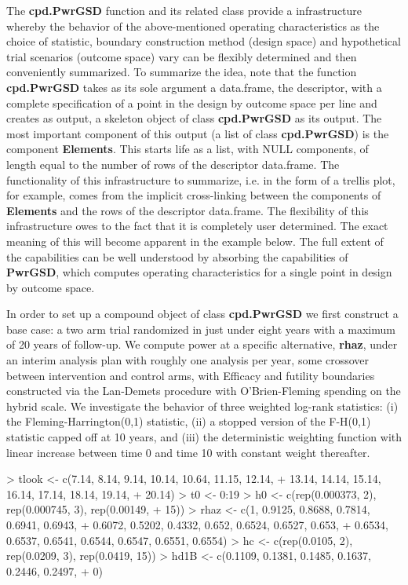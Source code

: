 \documentclass{article}
\begin{document}
The {\bf cpd.PwrGSD} function and its related class provide a infrastructure whereby the
behavior of the above-mentioned operating characteristics as the choice of statistic,
boundary construction method (design space) and hypothetical trial scenarios (outcome
space) vary can be flexibly determined and then conveniently summarized.  To summarize the
idea, note that the function {\bf cpd.PwrGSD} takes as its sole argument a data.frame, the
descriptor, with a complete specification of a point in the design by outcome space per
line and creates as output, a skeleton object of class {\bf cpd.PwrGSD} as its output.
The most important component of this output (a list of class {\bf cpd.PwrGSD}) is the
component {\bf Elements}. This starts life as a list, with NULL components, of length
equal to the number of rows of the descriptor data.frame. The functionality of this
infrastructure to summarize, i.e. in the form of a trellis plot, for example, comes from
the implicit cross-linking between the components of {\bf Elements} and the rows of the
descriptor data.frame.  The flexibility of this infrastructure owes to the fact that it is
completely user determined.  The exact meaning of this will become apparent in the example
below. The full extent of the capabilities can be well understood by absorbing the
capabilities of {\bf PwrGSD}, which computes operating characteristics for a single point
in design by outcome space.

In order to set up a compound object of class {\bf cpd.PwrGSD} we first construct a base
case: a two arm trial randomized in just under eight years with a maximum of 20 years of
follow-up. We compute power at a specific alternative, {\bf rhaz}, under an interim
analysis plan with roughly one analysis per year, some crossover between intervention and
control arms, with Efficacy and futility boundaries constructed via the Lan-Demets
procedure with O'Brien-Fleming spending on the hybrid scale. We investigate the behavior of
three weighted log-rank statistics: (i) the Fleming-Harrington(0,1) statistic,
(ii) a stopped version of the F-H(0,1) statistic capped off at 10 years, and
(iii) the deterministic weighting function with linear increase between time 0
and time 10 with constant weight thereafter.

\begin{Schunk}
\begin{Sinput}
> tlook <- c(7.14, 8.14, 9.14, 10.14, 10.64, 11.15, 12.14, 
+     13.14, 14.14, 15.14, 16.14, 17.14, 18.14, 19.14, 
+     20.14)
> t0 <- 0:19
> h0 <- c(rep(0.000373, 2), rep(0.000745, 3), rep(0.00149, 
+     15))
> rhaz <- c(1, 0.9125, 0.8688, 0.7814, 0.6941, 0.6943, 
+     0.6072, 0.5202, 0.4332, 0.652, 0.6524, 0.6527, 0.653, 
+     0.6534, 0.6537, 0.6541, 0.6544, 0.6547, 0.6551, 0.6554)
> hc <- c(rep(0.0105, 2), rep(0.0209, 3), rep(0.0419, 15))
> hd1B <- c(0.1109, 0.1381, 0.1485, 0.1637, 0.2446, 0.2497, 
+     0)
\end{Sinput}
\end{Schunk}
\end{document}
